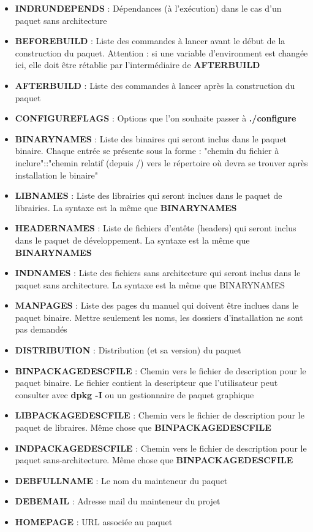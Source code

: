 \documentclass[12pt,a4paper]{article}
\begin{document}
\begin{itemize}
	\item \textbf{INDRUNDEPENDS} : Dépendances (à l'exécution) dans le cas d'un paquet sans architecture
	\item \textbf{BEFOREBUILD} : Liste des commandes à lancer avant le début de la construction du paquet. Attention : si une variable d'environment est changée ici, elle doit être rétablie par l'intermédiaire de \textbf{AFTERBUILD}
	\item \textbf{AFTERBUILD} : Liste des commandes à lancer après la construction du paquet
	\item \textbf{CONFIGUREFLAGS} : Options que l'on souhaite passer à \textbf{./configure}
	\item \textbf{BINARYNAMES} : Liste des binaires qui seront inclus dans le paquet binaire. Chaque entrée se présente sous la forme : "chemin du fichier à inclure"::"chemin relatif (depuis /) vers le répertoire où devra se trouver après installation le binaire"
	\item \textbf{LIBNAMES} : Liste des librairies qui seront inclues dans le paquet de librairies. La syntaxe est la même que \textbf{BINARYNAMES}
	\item \textbf{HEADERNAMES} : Liste de fichiers d'entête (headers) qui seront inclus dans le paquet de développement. La syntaxe est la même que \textbf{BINARYNAMES}
	\item \textbf{INDNAMES} : Liste des fichiers sans architecture qui seront inclus dans le paquet sans architecture. La syntaxe est la même que BINARYNAMES
	\item \textbf{MANPAGES} : Liste des pages du manuel qui doivent être inclues dans le paquet binaire. Mettre seulement les noms, les dossiers d'installation ne sont pas demandés
	\item \textbf{DISTRIBUTION} : Distribution (et sa version) du paquet
	\item \textbf{BINPACKAGEDESCFILE} : Chemin vers le fichier de description pour le paquet binaire. Le fichier contient la descripteur que l'utilisateur peut consulter avec \textbf{dpkg -I} ou un gestionnaire de paquet graphique
	\item \textbf{LIBPACKAGEDESCFILE} : Chemin vers le fichier de description pour le paquet de libraires. Même chose que \textbf{BINPACKAGEDESCFILE}
	\item \textbf{INDPACKAGEDESCFILE} : Chemin vers le fichier de description pour le paquet sans-architecture. Même chose que \textbf{BINPACKAGEDESCFILE}
	\item \textbf{DEBFULLNAME} : Le nom du mainteneur du paquet
	\item \textbf{DEBEMAIL} : Adresse mail du mainteneur du projet
	\item \textbf{HOMEPAGE} : URL associée au paquet
\end{itemize}
\end{document}
